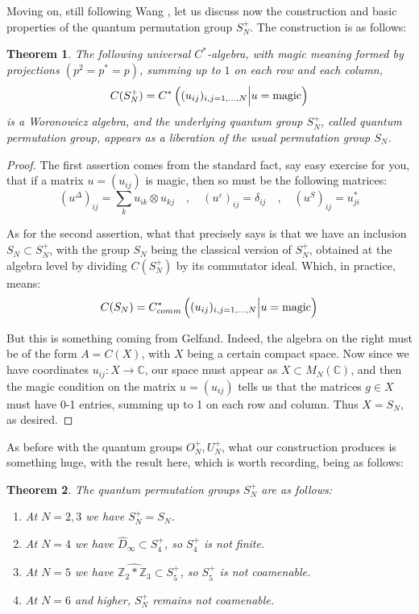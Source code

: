 \documentclass[12pt]{amsbook}
\newtheorem{theorem}{Theorem}[chapter]
\begin{document}
Moving on, still following Wang \cite{wan}, let us discuss now the construction and basic properties of the quantum permutation group $S_N^+$. The construction is as follows:

\begin{theorem}
The following universal $C^*$-algebra, with magic meaning formed by projections $(p^2=p^*=p)$, summing up to $1$ on each row and each column,
$$C(S_N^+)=C^*\left((u_{ij})_{i,j=1,\ldots,N}\Big|u={\rm magic}\right)$$
is a Woronowicz algebra, and the underlying quantum group $S_N^+$, called quantum permutation group, appears as a liberation of the usual permutation group $S_N$.
\end{theorem}

\begin{proof}
The first assertion comes from the standard fact, say easy exercise for you, that if a matrix $u=(u_{ij})$ is magic, then so must be the following matrices:
$$(u^\Delta)_{ij}=\sum_ku_{ik}\otimes u_{kj}\quad,\quad 
(u^\varepsilon)_{ij}=\delta_{ij}\quad,\quad 
(u^S)_{ij}=u_{ji}^*$$

As for the second assertion, what that precisely says is that we have an inclusion $S_N\subset S_N^+$, with the group $S_N$ being the classical version of $S_N^+$, obtained at the algebra level by dividing $C(S_N^+)$ by its commutator ideal. Which, in practice, means:
$$C(S_N)=C^*_{comm}\left((u_{ij})_{i,j=1,\ldots,N}\Big|u={\rm magic}\right)$$

But this is something coming from Gelfand. Indeed, the algebra on the right must be of the form $A=C(X)$, with $X$ being a certain compact space. Now since we have coordinates $u_{ij}:X\to\mathbb C$, our space must appear as $X\subset M_N(\mathbb C)$, and then the magic condition on the matrix $u=(u_{ij})$ tells us that the matrices $g\in X$ must have 0-1 entries, summing up to 1 on each row and column. Thus $X=S_N$, as desired.
\end{proof}

As before with the quantum groups $O_N^+,U_N^+$, what our construction produces is something huge, with the result here, which is worth recording, being as follows:

\begin{theorem}
The quantum permutation groups $S_N^+$ are as follows:
\begin{enumerate}
\item At $N=2,3$ we have $S_N^+=S_N$.

\item At $N=4$ we have $\widehat{D}_\infty\subset S_4^+$, so $S_4^+$ is not finite.

\item At $N=5$ we have $\widehat{\mathbb Z_2*\mathbb Z_3}\subset S_5^+$, so $S_5^+$ is not coamenable.

\item At $N=6$ and higher, $S_N^+$ remains not coamenable.
\end{enumerate}
\end{theorem}
\end{document}
